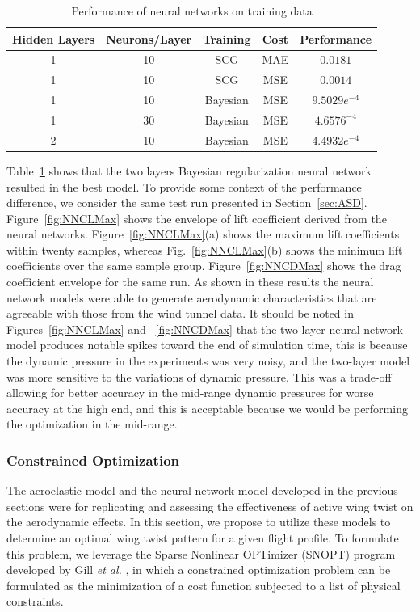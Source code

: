 \documentclass[11pt]{ucthesis}
\begin{document}
\begin{table}[h]
\caption{Performance of neural networks on training data}
\label{tab:error}
\begin{center}
\begin{tabular}{|c||c||c||c||c|}
\hline
Hidden Layers&Neurons/Layer&Training&Cost&Performance\\
\hline
1 & 10&SCG&MAE&$0.0181$\\
\hline
1 & 10&SCG&MSE&$0.0014$\\
\hline
1 & 10&Bayesian&MSE&$9.5029e^{-4}$\\
\hline
1 & 30&Bayesian&MSE&$4.6576^{-4}$\\
\hline
2& 10&Bayesian&MSE&$4.4932e^{-4}$\\
\hline
\end{tabular}
\end{center}
\end{table}
Table~\ref{tab:error} shows that the two layers Bayesian regularization neural network resulted in the best model. To provide some context of the performance difference, we consider the same test run presented in Section~\ref{sec:ASD}. Figure~\ref{fig:NNCLMax} shows the envelope of lift coefficient derived from the neural networks. Figure~\ref{fig:NNCLMax}(a) shows the maximum lift coefficients within twenty samples, whereas Fig.~\ref{fig:NNCLMax}(b) shows the minimum lift coefficients over the same sample group. Figure~\ref{fig:NNCDMax} shows the drag coefficient envelope for the same run. As shown in these results the neural network models were able to generate aerodynamic characteristics that are agreeable with those from the wind tunnel data. It should be noted in Figures~\ref{fig:NNCLMax} and ~\ref{fig:NNCDMax} that the two-layer neural network model produces notable spikes toward the end of simulation time, this is because the dynamic pressure in the experiments was very noisy, and the two-layer model was more sensitive to the variations of dynamic pressure. This was a trade-off allowing for better accuracy in the mid-range dynamic pressures for worse accuracy at the high end, and this is acceptable because we would be performing the optimization in the mid-range. 

\subsubsection{Constrained Optimization}
\label{sec:Copt}
The aeroelastic model and the neural network model developed in the previous sections were for replicating and assessing the effectiveness of active wing twist on the aerodynamic effects. In this section, we propose to utilize these models to determine an optimal wing twist pattern for a given flight profile. To formulate this problem, we leverage the Sparse Nonlinear OPTimizer (SNOPT) program developed by Gill {\it et al.} \cite{gill2005snopt}, in which a constrained optimization problem can be formulated as the minimization of a cost function subjected to a list of physical constraints.     
\end{document}
